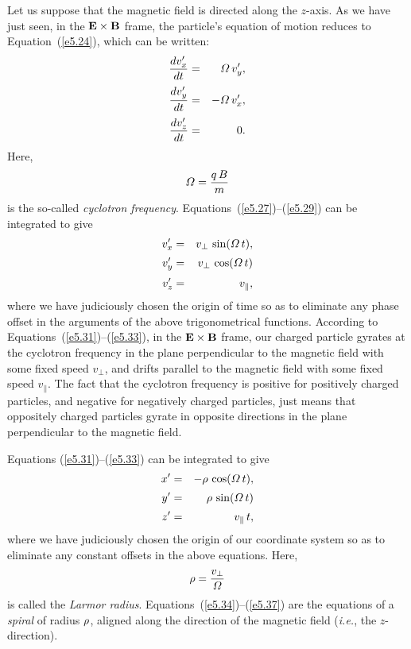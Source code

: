 Let us suppose that the magnetic field is directed along the $z$-axis. 
As we have just seen, in the ${\bf E}\times{\bf B}$ frame, the particle's equation of motion reduces to Equation~(\ref{e5.24}), which can be written:
\begin{eqnarray}\label{e5.27}
\frac{d v_x'}{dt} &=& {\mit\Omega}\,v_y',\\[0.5ex]
\frac{d v_y'}{dt} &=& -{\mit\Omega}\,v_x',\\[0.5ex]
\frac{d v_z'}{dt} &=& 0.\label{e5.29}
\end{eqnarray}
Here,
\begin{equation}
{\mit\Omega} = \frac{q\,B}{m}
\end{equation}
is the so-called {\em cyclotron frequency}.
Equations~(\ref{e5.27})--(\ref{e5.29}) can be integrated to give
\begin{eqnarray}\label{e5.31}
v_x'&=& v_\perp\,\sin({\mit\Omega}\,t),\\[0.5ex]
v_y'&=&v_\perp\,\cos({\mit\Omega}\,t)\\[0.5ex]
v_z' &=& v_\parallel,\label{e5.33}
\end{eqnarray}
where we have judiciously chosen the origin of time so as to eliminate
any phase offset in the arguments of the above trigonometrical functions.
According to Equations~(\ref{e5.31})--(\ref{e5.33}), in the ${\bf E}\times {\bf B}$
frame, our charged particle gyrates at the cyclotron frequency in the plane perpendicular to the
magnetic field with some fixed speed $v_\perp$, and drifts parallel to the magnetic
field with  some  fixed speed $v_\parallel$. 
The fact that the cyclotron frequency is positive for positively charged
particles, and negative for negatively charged particles, just means that
oppositely charged particles gyrate in opposite directions in the
plane perpendicular to the magnetic field.

Equations (\ref{e5.31})--(\ref{e5.33}) can be integrated to give
\begin{eqnarray}\label{e5.34}
x'&=& -{\mit\rho}\,\cos({\mit\Omega}\,t),\\[0.5ex]
y'&=&{\mit\rho}\,\sin({\mit\Omega}\,t)\\[0.5ex]
z' &=& v_\parallel\,t,\label{e5.37}
\end{eqnarray}
where we have  judiciously chosen the origin of our coordinate system so
as to eliminate any constant offsets in the above equations.
Here,
\begin{equation}
{\bf \rho} = \frac{v_\perp}{{\mit\Omega}}
\end{equation}
is called the {\em Larmor radius}. Equations~(\ref{e5.34})--(\ref{e5.37})
are the equations of a {\em spiral}\/ of radius ${\mit\rho}$, aligned along the direction
of the magnetic field ({\em i.e.}, the $z$-direction).

